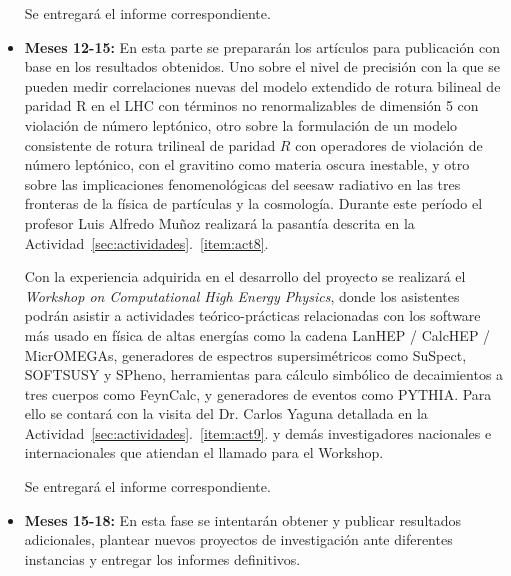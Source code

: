 \begin{bbrpvlhc}
\begin{itemize}
  Se entregará el informe correspondiente.

\item \textbf{Meses 12-15:} En esta parte se prepararán los artículos
  para publicación con base en los resultados obtenidos. Uno sobre el
  nivel de precisión con la que se pueden medir correlaciones nuevas
  del modelo extendido de rotura bilineal de paridad R en el LHC con
  términos no renormalizables de dimensión 5 con violación de número
  leptónico, otro sobre la formulación de un modelo consistente de
  rotura trilineal de paridad $R$ con operadores de violación de
  número leptónico, con el gravitino como materia oscura inestable, y
  otro sobre las implicaciones fenomenológicas del seesaw radiativo en
  las tres fronteras de la física de partículas y la
  cosmología. Durante este período el profesor Luis Alfredo Muñoz
  realizará la pasantía descrita en la
  Actividad~\ref{sec:actividades}.~\ref{item:act8}.

  Con la experiencia adquirida en el desarrollo del proyecto se
  realizará el \emph{Workshop on Computational High Energy Physics},
  donde los asistentes podrán asistir a actividades teórico-prácticas
  relacionadas con los software más usado en física de altas energías
  como la cadena LanHEP / CalcHEP / MicrOMEGAs, generadores de espectros
  supersimétricos como SuSpect, SOFTSUSY y SPheno, herramientas para
  cálculo simbólico de decaimientos a tres cuerpos como FeynCalc, y
  generadores de eventos como PYTHIA. Para ello se contará con la
  visita del Dr. Carlos Yaguna detallada en la
  Actividad~\ref{sec:actividades}.~\ref{item:act9}. y demás
  investigadores nacionales e internacionales que atiendan el llamado
  para el Workshop.

  Se entregará el informe correspondiente.
\item \textbf{Meses 15-18:}
  En esta fase se intentarán obtener y publicar resultados
  adicionales, plantear nuevos proyectos de investigación ante
  diferentes instancias y entregar los informes definitivos.
\end{itemize}


\end{bbrpvlhc}
